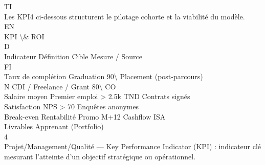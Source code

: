 \vspace{0.5em}
\vspace{0.5em}
\vspace{0.5em}
\vspace{0.5em}
TI\\
Les KPI4 ci-dessous structurent le pilotage cohorte et la viabilité du modèle.\\
\vspace{0.5em}
\vspace{0.5em}
\vspace{0.5em}
\vspace{0.5em}
EN\\
KPI \textbackslash{}& ROI\\
\vspace{0.5em}
\vspace{0.5em}
\vspace{0.5em}
\vspace{0.5em}
D\\
Indicateur                       Définition                     Cible            Mesure / Source\\
\vspace{0.5em}
\vspace{0.5em}
\vspace{0.5em}
\vspace{0.5em}
FI\\
Taux de complétion               Graduation                     90\textbackslash{}%
Placement (post-parcours)\\
N  CDI / Freelance / Grant        80\textbackslash{}%
CO\\
Salaire moyen                    Premier emploi                 \textgreater{} 2.5k TND       Contrats signés\\
Satisfaction                     NPS                            \textgreater{} 70             Enquêtes anonymes\\
Break-even                       Rentabilité Promo              M+12             Cashflow ISA\\
\vspace{0.5em}
\vspace{0.5em}
\vspace{0.5em}
Livrables Apprenant (Portfolio)\\
4\\
Projet/Management/Qualité — Key Performance Indicator (KPI) : indicateur clé mesurant l’atteinte d’un objectif stratégique ou opérationnel.\\
